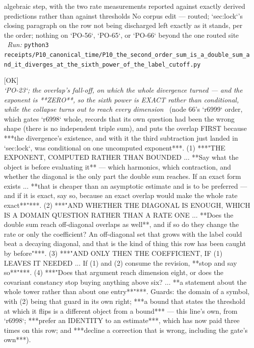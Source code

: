 \begin{description}
algebraic step, with the two rate measurements reported against exactly derived predictions rather than against thresholds  No corpus edit --- routed; `sec:lock`'s closing paragraph on the row not being discharged left exactly as it stands, per the order; nothing on `PO-56`, `PO-65`, or `PO-66` beyond the one routed site
\ \emph{Run:} \texttt{python3 receipts/P10\_canonical\_time/P10\_the\_second\_order\_sum\_is\_a\_double\_sum\_and\_it\_diverges\_at\_the\_sixth\_power\_of\_the\_label\_cutoff.py}
\item[\rcptlabel{P10_the_overlap_does_not_fall_off_at_all_so_the_sixth_power_is_exact_and_the_collapse_reaches_every_dimension}{P10R46}\textbf{P10R46}\quad\texttt{P10\_the\_overlap\_does\_not\_fall\_off\_at\_all\_so\_the\_sixth\_power\_is\_exact\_and\_the\_collapse\_reaches\_every\_dimension}]\hfill\textsf{[OK]}\\
\textit{`PO-23`; the overlap's fall-off, on which the whole divergence turned --- and the exponent is **ZERO**, so the sixth power is EXACT rather than conditional, while the collapse turns out to reach every dimension} \ (node 66's `r6999` order, which gates `r6998` whole, records that its own question had been the wrong shape (there is no independent triple sum), and puts the overlap FIRST because ***the divergence's existence, and with it the third subtraction just landed in `sec:lock`, was conditional on one uncomputed exponent***. (1) ***"THE EXPONENT, COMPUTED RATHER THAN BOUNDED ... **Say what the object is before evaluating it** --- which harmonics, which contraction, and whether the diagonal is the only part the double sum reaches. If an exact form exists ... **that is cheaper than an asymptotic estimate and is to be preferred --- and if it is exact, say so, because an exact overlap would make the whole rate exact**"***. (2) ***"AND WHETHER THE DIAGONAL IS ENOUGH, WHICH IS A DOMAIN QUESTION RATHER THAN A RATE ONE ... **Does the double sum reach off-diagonal overlaps as well**, and if so do they change the rate or only the coefficient?  An off-diagonal set that grows with the label could beat a decaying diagonal, and that is the kind of thing this row has been caught by before"***. (3) ***"AND ONLY THEN THE COEFFICIENT, IF (1) LEAVES IT NEEDED ... If (1) and (2) consume the revision, **stop and say so**"***. (4) ***"Does that argument reach dimension eight, or does the covariant constancy stop buying anything above six? ... **a statement about the whole tower rather than about one entry**"***.  Guards: the domain of a symbol, with (2) being that guard in its own right; ***a bound that states the threshold at which it flips is a different object from a bound*** --- this line's own, from `r6998`; ***prefer an IDENTITY to an estimate***, which has now paid three times on this row; and ***decline a correction that is wrong, including the gate's own***). 

\end{description}

